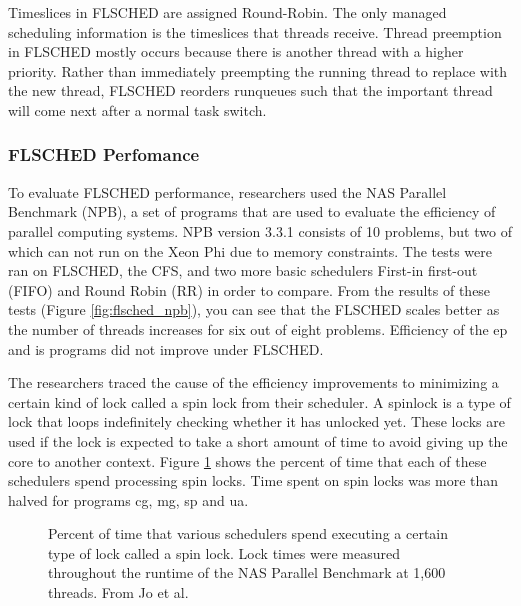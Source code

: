 \documentclass{sig-alternate}
\begin{document}
Timeslices in FLSCHED are assigned Round-Robin. The only managed scheduling information is the timeslices that threads receive. Thread preemption in FLSCHED mostly occurs because there is another thread with a higher priority. Rather than immediately preempting the running thread to replace with the new thread, FLSCHED reorders runqueues such that the important thread will come next after a normal task switch.~\cite{Jo:2017}


\subsubsection{FLSCHED Perfomance}
\label{sec:flsched_performance}

To evaluate FLSCHED performance, researchers used the NAS Parallel Benchmark (NPB), a set of programs that are used to evaluate the efficiency of parallel computing systems. NPB version 3.3.1 consists of 10 problems, but two of which can not run on the Xeon Phi due to memory constraints. The tests were ran on FLSCHED, the CFS, and two more basic schedulers First-in first-out (FIFO) and Round Robin (RR) in order to compare. From the results of these tests (Figure \ref{fig:flsched_npb}), you can see that the FLSCHED scales better as the number of threads increases for six out of eight problems. Efficiency of the ep and is programs did not improve under FLSCHED. \cite{Jo:2017}

\begin{figure*}
\centering
{}
\caption{FLSCHED performance comparison of various schedulers on programs in the NAS Parallel Benchmark. From Jo et al.~\cite{Jo:2017}}
\label{fig:flsched_npb}
\end{figure*}


The researchers traced the cause of the efficiency improvements to minimizing a certain kind of lock called a spin lock from their scheduler. A spinlock is a type of lock that loops indefinitely checking whether it has unlocked yet. These locks are used if the lock is expected to take a short amount of time to avoid giving up the core to another context. Figure \ref{fig:flsched_spinlock} shows the percent of time that each of these schedulers spend processing spin locks. Time spent on spin locks was more than halved for programs cg, mg, sp and ua. \cite{Jo:2017}

\begin{figure}
\centering
{}
\caption{ Percent of time that various schedulers spend executing a certain type of lock called a spin lock. Lock times were measured throughout the runtime of the NAS Parallel Benchmark at 1,600 threads. From Jo et al.~\cite{Jo:2017}}
\label{fig:flsched_spinlock}
\end{figure}
\end{document}
